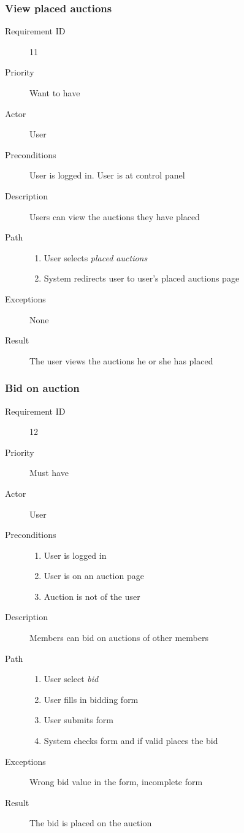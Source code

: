 		\subsubsection{View placed auctions}
			\begin{description}
				\item[Requirement ID] 11
				\item[Priority] Want to have
				\item[Actor] User
				\item[Preconditions] User is logged in. User is at control panel
				\item[Description] Users can view the auctions they have placed
				\item[Path]
 					\begin{enumerate}
						\item User selects \emph{placed auctions}
						\item System redirects user to user's placed auctions page
					\end{enumerate}
				\item[Exceptions] None
				\item[Result] The user views the auctions he or she has placed
			\end{description}
		\subsubsection{Bid on auction}
			\begin{description}
				\item[Requirement ID] 12
				\item[Priority] Must have
				\item[Actor] User
				\item[Preconditions] 
 					\begin{enumerate}
						\item User is logged in
						\item User is on an auction page
						\item Auction is not of the user
					\end{enumerate}
				\item[Description] Members can bid on auctions of other members
				\item[Path]
 					\begin{enumerate}
						\item User select \emph{bid}
						\item User fills in bidding form
						\item User submits form
						\item System checks form and if valid places the bid
					\end{enumerate}
				\item[Exceptions] Wrong bid value in the form, incomplete form
				\item[Result] The bid is placed on the auction
			\end{description}
